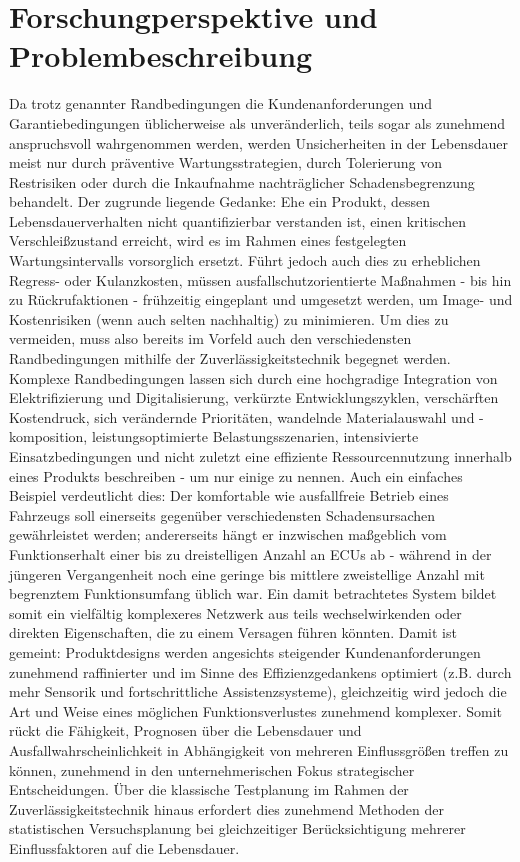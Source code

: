 \section{Forschungperspektive und Problembeschreibung}
Da trotz genannter Randbedingungen die Kundenanforderungen und Garantiebedingungen üblicherweise als unveränderlich, teils sogar als zunehmend anspruchsvoll wahrgenommen werden, werden Unsicherheiten in der Lebensdauer meist nur durch präventive Wartungsstrategien, durch Tolerierung von Restrisiken oder durch die Inkaufnahme nachträglicher Schadensbegrenzung behandelt.
Der zugrunde liegende Gedanke: Ehe ein Produkt, dessen Lebensdauerverhalten nicht quantifizierbar verstanden ist, einen kritischen Verschleißzustand erreicht, wird es im Rahmen eines festgelegten Wartungsintervalls vorsorglich ersetzt.
Führt jedoch auch dies zu erheblichen Regress- oder Kulanzkosten, müssen ausfallschutzorientierte Maßnahmen - bis hin zu Rückrufaktionen - frühzeitig eingeplant und umgesetzt werden, um Image- und Kostenrisiken (wenn auch selten nachhaltig) zu minimieren.
Um dies zu vermeiden, muss also bereits im Vorfeld auch den verschiedensten Randbedingungen mithilfe der Zuverlässigkeitstechnik begegnet werden.
Komplexe Randbedingungen lassen sich durch eine hochgradige Integration von Elektrifizierung und Digitalisierung, verkürzte Entwicklungszyklen, verschärften Kostendruck, sich verändernde Prioritäten, wandelnde Materialauswahl und -komposition, leistungsoptimierte Belastungsszenarien, intensivierte Einsatzbedingungen und nicht zuletzt eine effiziente Ressourcennutzung innerhalb eines Produkts beschreiben - um nur einige zu nennen.
Auch ein einfaches Beispiel verdeutlicht dies: Der komfortable wie ausfallfreie Betrieb eines Fahrzeugs soll einerseits gegenüber verschiedensten Schadensursachen gewährleistet werden; andererseits hängt er inzwischen maßgeblich vom Funktionserhalt einer bis zu dreistelligen Anzahl an \acp{ECU} ab - während in der jüngeren Vergangenheit noch eine geringe bis mittlere zweistellige Anzahl mit begrenztem Funktionsumfang üblich war.
Ein damit betrachtetes System bildet somit ein vielfältig komplexeres Netzwerk aus teils wechselwirkenden oder direkten Eigenschaften, die zu einem Versagen führen könnten.
Damit ist gemeint: Produktdesigns werden angesichts steigender Kundenanforderungen zunehmend raffinierter und im Sinne des Effizienzgedankens optimiert (z.B. durch mehr Sensorik und fortschrittliche Assistenzsysteme), gleichzeitig wird jedoch die Art und Weise eines möglichen Funktionsverlustes zunehmend komplexer.
Somit rückt die Fähigkeit, Prognosen über die Lebensdauer und Ausfallwahrscheinlichkeit in Abhängigkeit von mehreren Einflussgrößen treffen zu können, zunehmend in den unternehmerischen Fokus strategischer Entscheidungen.
Über die klassische Testplanung im Rahmen der Zuverlässigkeitstechnik hinaus erfordert dies zunehmend Methoden der statistischen Versuchsplanung bei gleichzeitiger Berücksichtigung mehrerer Einflussfaktoren auf die Lebensdauer.

